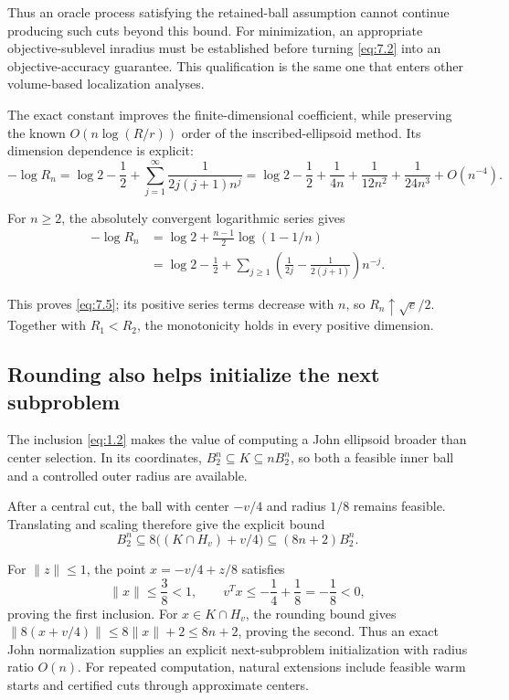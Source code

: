 Thus an oracle process satisfying the retained-ball assumption cannot continue producing such cuts beyond this bound. For minimization, an appropriate objective-sublevel inradius must be established before turning \eqref{eq:7.2} into an objective-accuracy guarantee. This qualification is the same one that enters other volume-based localization analyses.

The exact constant improves the finite-dimensional coefficient, while preserving the known $O(n\log(R/r))$ order of the inscribed-ellipsoid method. Its dimension dependence is explicit:
\begin{equation}\label{eq:7.5}
-\log R_n=\log2-\frac12+
\sum_{j=1}^{\infty}\frac1{2j(j+1)n^j}
=\log2-\frac12+\frac1{4n}+\frac1{12n^2}+\frac1{24n^3}+O(n^{-4}).
\end{equation}

For $n\ge2$, the absolutely convergent logarithmic series gives
\begin{equation}\label{eq:7.6}
\begin{aligned}
-\log R_n
&=\log2+\frac{n-1}{2}\log(1-1/n)\\
&=\log2-\frac12
+\sum_{j\ge1}\left(\frac1{2j}-\frac1{2(j+1)}\right)n^{-j}.
\end{aligned}
\end{equation}

This proves \eqref{eq:7.5}; its positive series terms decrease with $n$, so $R_n\uparrow\sqrt e/2$. Together with $R_1<R_2$, the monotonicity holds in every positive dimension.

\subsection{Rounding also helps initialize the next subproblem}\label{sec:7.2}

The inclusion \eqref{eq:1.2} makes the value of computing a John ellipsoid broader than center selection. In its coordinates, $B_2^n\subseteq K\subseteq nB_2^n$, so both a feasible inner ball and a controlled outer radius are available.

After a central cut, the ball with center $-v/4$ and radius $1/8$ remains feasible. Translating and scaling therefore give the explicit bound
\begin{equation}\label{eq:7.7}
B_2^n\subseteq 8\bigl((K\cap H_v)+v/4\bigr)
\subseteq(8n+2)B_2^n.
\end{equation}

For $\|z\|\le1$, the point $x=-v/4+z/8$ satisfies
\begin{equation}\label{eq:7.8}
\|x\|\le\frac38<1,\qquad v^Tx\le-\frac14+\frac18=-\frac18<0,
\end{equation}
proving the first inclusion. For $x\in K\cap H_v$, the rounding bound gives
$\|8(x+v/4)\|\le8\|x\|+2\le8n+2$, proving the second.
Thus an exact John normalization supplies an explicit next-subproblem initialization with radius ratio $O(n)$. For repeated computation, natural extensions include feasible warm starts and certified cuts through approximate centers.

